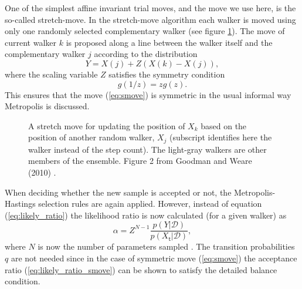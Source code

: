 \documentclass{wihuri}
\def\be{\begin{equation}}
\def\ee{\end{equation}}
\def\tstep{\mathsf{t}}
\begin{document}



One of the simplest affine invariant trial moves, and the move we use here, is the so-called stretch-move. In the stretch-move algorithm each walker is moved using only one randomly selected complementary walker (see figure \ref{fig:smove}). The move of current walker $k$ is proposed along a line between the walker itself and the complementary walker $j$ according to the distribution \cite{emceehammer}
\be \label{eq:smove}
Y = X(j) + Z(X(k)-X(j)),
\ee
where the scaling variable $Z$ satisfies the symmetry condition
\be \label{eq:symmetry_condition}
g(1/z) = zg(z).
\ee
This ensures that the move (\ref{eq:smove}) is symmetric in the usual informal way Metropolis is discussed.%


\begin{figure}
\centerline{}
\caption{A stretch move for updating the position of $X_{k}$ based on the position of another random walker, $X_{j}$ (subscript identifies here the walker instead of the step count). The light-gray walkers are other members of the ensemble. Figure 2 from Goodman and Weare (2010) \cite{ensemble1}.
\label{fig:smove}}
\end{figure}


When deciding whether the new sample is accepted or not, the Metropolis-Hastings selection rules are again applied. However, instead of equation (\ref{eq:likely_ratio}) the likelihood ratio is now calculated (for a given walker) as
\be \label{eq:likely_ratio_smove} 
\alpha = Z^{N-1}\frac{p(Y|\mathcal{D})}{p(X_{\tstep}|\mathcal{D})},
\ee
where $N$ is now the number of parameters sampled \cite{emceehammer}. The transition probabilities $q$ are not needed since in the case of symmetric move (\ref{eq:smove}) the acceptance ratio (\ref{eq:likely_ratio_smove}) can be shown to satisfy the detailed balance condition. 



\end{document}
